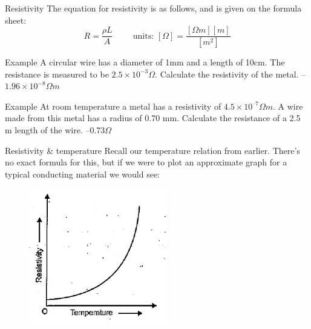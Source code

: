 \documentclass[../Main.tex]{subfiles}
\begin{document}
\begin{frame}{Resistivity}
The equation for resistivity is as follows, and is given on the formula sheet:
    {\huge
    \begin{equation*}
        R =\frac{\rho L}{A} \hspace{1cm} \mbox{units: } [\Omega]=\frac{[\Omega m] [m]}{[m^2]}
    \end{equation*}}
    \pause
    \begin{exampleblock}{Example}
    A circular wire has a diameter of 1mm and a length of 10cm. The resistance is measured to be $2.5\times 10^{-3}\Omega$. Calculate the resistivity of the metal. \pause
    --$1.96\times 10^{-8} \Omega m$
    \end{exampleblock}
    \pause
    \begin{exampleblock}{Example}
    At room temperature a metal has a resistivity of $4.5 \times 10^{–7} \Omega m$. A wire made from this metal has a radius of 0.70 mm. Calculate the resistance of a 2.5 m length of the wire. \pause
    --0.73$\Omega$
    \end{exampleblock}
\end{frame}

\begin{frame}{Resistivity \& temperature}
    Recall our temperature relation from earlier. There's no exact formula for this, but if we were to plot an approximate graph for a typical conducting material we would see: 
    
    \begin{figure}
        \centering
        \includegraphics[width=6cm]{Electricity_Images/resistivity_temperature.jpg}
    \end{figure}
\end{frame}
\end{document}
